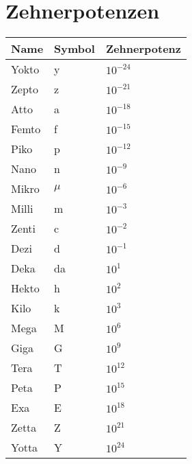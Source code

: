 \section{Zehnerpotenzen}
\begin{center}
\begin{tabular}{|C{2.5cm}|C{2.5cm}|C{2.5cm}|}
\hline
{}
Name		&	Symbol	&	Zehnerpotenz 	\tabularnewline\hline
Yokto	&	y		&	$10^{-24}$		\tabularnewline\hline
Zepto	&	z		&	$10^{-21}$		\tabularnewline\hline
Atto		&	a		&	$10^{-18}$		\tabularnewline\hline
Femto	&	f		&	$10^{-15}$		\tabularnewline\hline
Piko		&	p		&	$10^{-12}$		\tabularnewline\hline
Nano		&	n		&	$10^{-9}$		\tabularnewline\hline
Mikro	&	$\mu$	&	$10^{-6}$		\tabularnewline\hline
Milli	&	m		&	$10^{-3}$		\tabularnewline\hline
Zenti	&	c		&	$10^{-2}$		\tabularnewline\hline
Dezi		&	d		&	$10^{-1}$		\tabularnewline\hline\hline
Deka		&	da		&	$10^1$			\tabularnewline\hline
Hekto	&	h		&	$10^2$			\tabularnewline\hline
Kilo		&	k		&	$10^3$			\tabularnewline\hline
Mega		&	M		&	$10^6$			\tabularnewline\hline
Giga		&	G		&	$10^9$			\tabularnewline\hline
Tera		&	T		&	$10^{12}$		\tabularnewline\hline
Peta		&	P		&	$10^{15}$		\tabularnewline\hline
Exa		&	E		&	$10^{18}$		\tabularnewline\hline
Zetta	&	Z		&	$10^{21}$		\tabularnewline\hline
Yotta	&	Y		&	$10^{24}$		\tabularnewline\hline
\end{tabular}
\end{center}